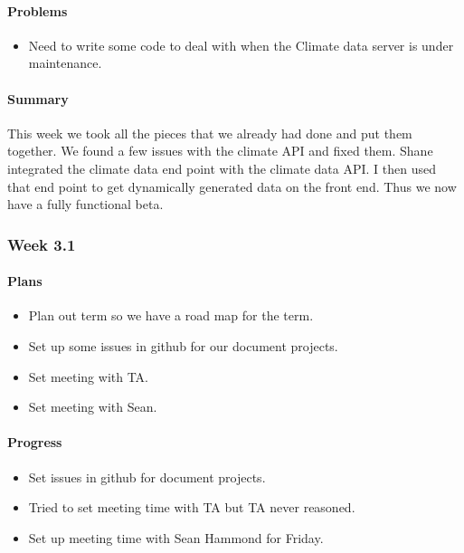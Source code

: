 \documentclass[onecolumn, draftclsnofoot,10pt, compsoc]{article}
\begin{document}
			\paragraph{Problems} \hfill \break
				\begin{itemize}
					\item Need to write some code to deal with when the Climate data server is under maintenance.
				\end{itemize}
			\paragraph{Summary} \hfill \break
			This week we took all the pieces that we already had done and put them together. We found a few issues with the climate API and fixed them. Shane integrated the climate data end point with the climate data API. I then used that end point to get dynamically generated data on the front end. Thus we now have a fully functional beta.\\
		
		\subsubsection{Week 3.1}
		    \paragraph{Plans} \hfill \break
		        \begin{itemize}
		            \item Plan out term so we have a road map for the term.\\
		            \item Set up some issues in github for our document projects.\\
		            \item Set meeting with TA.\\
		            \item Set meeting with Sean.\\
		        \end{itemize}
		    \paragraph{Progress} \hfill \break
		        \begin{itemize}
		            \item Set issues in github for document projects.
		            \item Tried to set meeting time with TA but TA never reasoned.\\
		            \item Set up meeting time with Sean Hammond for Friday.\\
		        \end{itemize}
\end{document}
